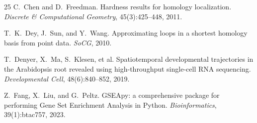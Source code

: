 \documentclass[12pt]{article}
\begin{document}
\begin{thebibliography}{25}
C.~Chen and D.~Freedman.
Hardness results for homology localization.
\emph{Discrete \& Computational Geometry}, 45(3):425--448, 2011.

T.~K.~Dey, J.~Sun, and Y.~Wang.
Approximating loops in a shortest homology basis from point data.
\emph{SoCG}, 2010.

T.~Denyer, X.~Ma, S.~Klesen, et al.
Spatiotemporal developmental trajectories in the Arabidopsis root revealed using high-throughput single-cell RNA sequencing.
\emph{Developmental Cell}, 48(6):840--852, 2019.

Z.~Fang, X.~Liu, and G.~Peltz.
GSEApy: a comprehensive package for performing Gene Set Enrichment Analysis in Python.
\emph{Bioinformatics}, 39(1):btac757, 2023.

\end{thebibliography}
\end{document}
